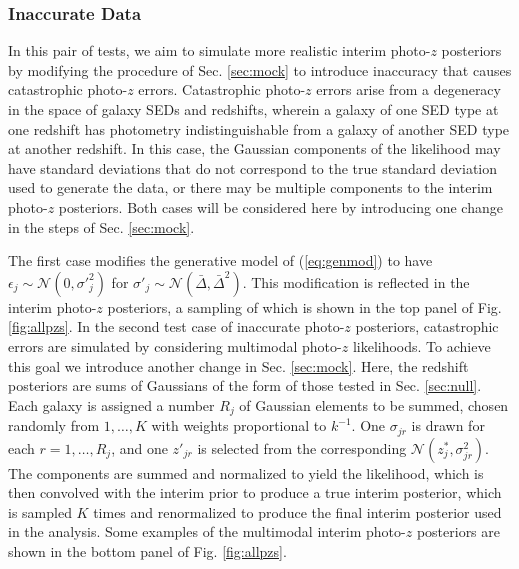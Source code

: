 \documentclass[preprint]{aastex}
\begin{document}
\subsubsection{Inaccurate Data}
\label{sec:inaccuracy}

In this pair of tests, we aim to simulate more realistic interim photo-$z$ 
posteriors by modifying the procedure of Sec. \ref{sec:mock} to introduce 
inaccuracy that causes catastrophic photo-$z$ errors.  Catastrophic photo-$z$ 
errors arise from a degeneracy in the space of galaxy SEDs and redshifts, 
wherein a galaxy of one SED type at one redshift has photometry 
indistinguishable from a galaxy of another SED type at another redshift.  In 
this case, the Gaussian components of the likelihood may have standard 
deviations that do not correspond to the true standard deviation used to 
generate the data, or there may be multiple components to the interim photo-$z$ 
posteriors.  Both cases will be considered here by introducing one change in 
the steps of Sec. \ref{sec:mock}.  

The first case modifies the generative model of (\ref{eq:genmod}) to have 
$\epsilon_{j}\sim\mathcal{N}(0,\sigma'^{2}_{j})$ for 
$\sigma'_{j}\sim\mathcal{N}(\bar{\Delta},\bar{\Delta}^{2})$.  This modification 
is reflected in the interim photo-$z$ posteriors, a sampling of which is shown 
in the top panel of Fig. \ref{fig:allpzs}.  In the second test case of 
inaccurate photo-$z$ posteriors, catastrophic errors are simulated by 
considering multimodal photo-$z$ likelihoods.  To achieve this goal we 
introduce another change in Sec. \ref{sec:mock}.  Here, the redshift posteriors 
are sums of Gaussians of the form of those tested in Sec. \ref{sec:null}.  Each 
galaxy is assigned a number $R_{j}$ of Gaussian elements to be summed, chosen 
randomly from $1,\dots,K$ with weights proportional to $k^{-1}$.  One 
$\sigma_{jr}$ is drawn for each $r=1,\dots,R_{j}$, and one $z'_{jr}$ is 
selected from the corresponding $\mathcal{N}(z^{*}_{j},\sigma^{2}_{jr})$.  The 
components are summed and normalized to yield the likelihood, which is then 
convolved with the interim prior to produce a true interim posterior, which is 
sampled $K$ times and renormalized to produce the final interim posterior used 
in the analysis.  Some examples of the multimodal interim photo-$z$ posteriors 
are shown in the bottom panel of Fig. \ref{fig:allpzs}.    
\end{document}
